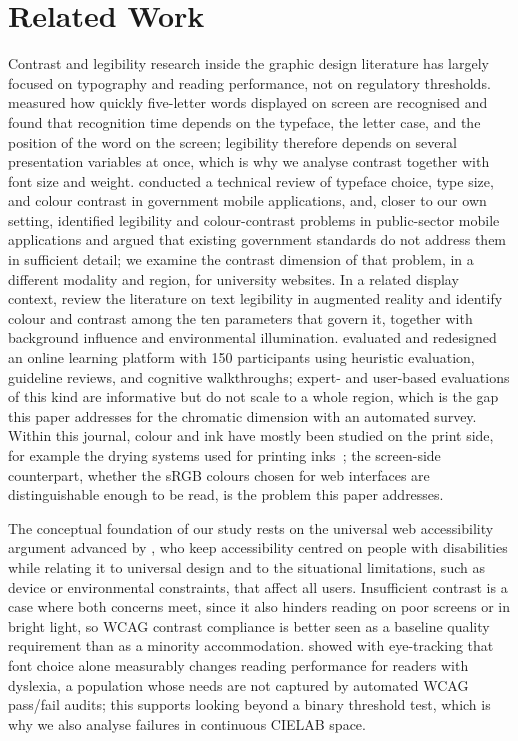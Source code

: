 \documentclass[10pt]{article}
\begin{document}
\section{Related Work}

Contrast and legibility research inside the graphic design literature has largely focused on typography and reading performance, not on regulatory thresholds. \citet*{weingerl2022visibility} measured how quickly five-letter words displayed on screen are recognised and found that recognition time depends on the typeface, the letter case, and the position of the word on the screen; legibility therefore depends on several presentation variables at once, which is why we analyse contrast together with font size and weight. \citet{punsongserm2025thai} conducted a technical review of typeface choice, type size, and colour contrast in government mobile applications, and, closer to our own setting, identified legibility and colour-contrast problems in public-sector mobile applications and argued that existing government standards do not address them in sufficient detail; we examine the contrast dimension of that problem, in a different modality and region, for university websites. In a related display context, \citet{jovic2026ar} review the literature on text legibility in augmented reality and identify colour and contrast among the ten parameters that govern it, together with background influence and environmental illumination. \citet{ofosuasare2024enhancing} evaluated and redesigned an online learning platform with 150 participants using heuristic evaluation, guideline reviews, and cognitive walkthroughs; expert- and user-based evaluations of this kind are informative but do not scale to a whole region, which is the gap this paper addresses for the chromatic dimension with an automated survey. Within this journal, colour and ink have mostly been studied on the print side, for example the drying systems used for printing inks~\citep{aydemir2021drying}; the screen-side counterpart, whether the sRGB colours chosen for web interfaces are distinguishable enough to be read, is the problem this paper addresses.

The conceptual foundation of our study rests on the universal web accessibility argument advanced by \citet*{henry2014role}, who keep accessibility centred on people with disabilities while relating it to universal design and to the situational limitations, such as device or environmental constraints, that affect all users. Insufficient contrast is a case where both concerns meet, since it also hinders reading on poor screens or in bright light, so WCAG contrast compliance is better seen as a baseline quality requirement than as a minority accommodation. \citet{rello2013fonts} showed with eye-tracking that font choice alone measurably changes reading performance for readers with dyslexia, a population whose needs are not captured by automated WCAG pass/fail audits; this supports looking beyond a binary threshold test, which is why we also analyse failures in continuous CIELAB space.
\end{document}
